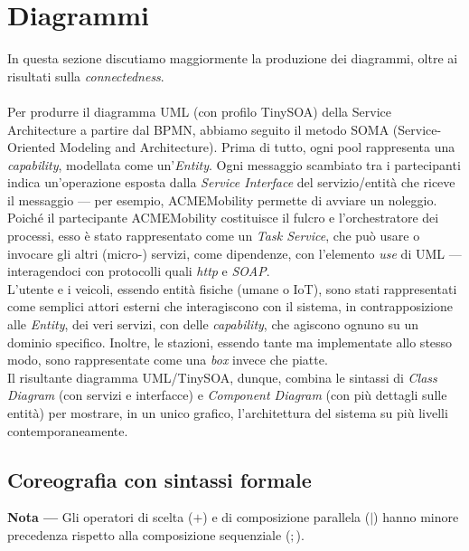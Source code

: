 \section{Diagrammi}\label{sec:diagrams}

In questa sezione discutiamo maggiormente la produzione dei diagrammi, oltre ai
risultati sulla \textit{connectedness}.\\
\\
Per produrre il diagramma UML (con profilo TinySOA) della Service Architecture a
partire dal BPMN, abbiamo seguito il metodo  SOMA (Service-Oriented Modeling and
Architecture). Prima di tutto, ogni pool rappresenta una \textit{capability},
modellata come un'\textit{Entity}. Ogni messaggio scambiato tra i partecipanti
indica un'operazione esposta dalla \textit{Service Interface} del
servizio/entità che riceve il messaggio --- per esempio, ACMEMobility permette
di avviare un noleggio.\\
Poiché il partecipante ACMEMobility costituisce il fulcro e l'orchestratore dei
processi, esso è stato rappresentato come un \textit{Task Service}, che può
usare o invocare gli altri (micro-) servizi, come dipendenze, con l'elemento
\textit{use} di UML --- interagendoci con protocolli quali \textit{http} e
\textit{SOAP}.\\
L'utente e i veicoli, essendo entità fisiche (umane o IoT), sono stati
rappresentati come semplici attori esterni che interagiscono con il sistema, in
contrapposizione alle \textit{Entity}, dei veri servizi, con delle
\textit{capability}, che agiscono ognuno su un dominio specifico. Inoltre, le
stazioni, essendo tante ma implementate allo stesso modo, sono rappresentate
come una \textit{box} invece che piatte.\\
Il risultante diagramma UML/TinySOA, dunque, combina le sintassi di
\textit{Class Diagram} (con servizi e interfacce) e \textit{Component Diagram}
(con più dettagli sulle entità) per mostrare, in un unico grafico,
l'architettura del sistema su più livelli contemporaneamente.\\



\subsection{Coreografia con sintassi formale}\label{sec:formal-choreography}

\textbf{Nota ---} Gli operatori di scelta ($+$) e di composizione parallela
($\mid$) hanno minore precedenza rispetto alla composizione sequenziale ($;$).\\

